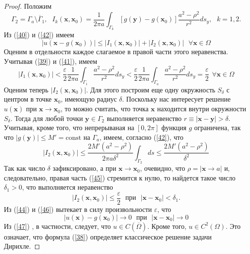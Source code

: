 \documentclass[14pt, a4paper]{extarticle}
\let\oldref\ref
\renewcommand{\ref}[1]{(\oldref{#1})}
\begin{document}
\begin{proof}
					Положим 
					\begin{equation}
						\Gamma_2 = \Gamma_a \setminus \overline{\Gamma}_1, \:\:\: I_k(\mathbf{x}, \mathbf{x}_0) = \dfrac{1}{2\pi a} \int_{\Gamma_k} [ g({\mathbf{y}}) - g({\mathbf{x}_0}) ] \dfrac{a^2-\rho^2}{r^2} ds_y, \:\:\: k = 1, 2. \label{42}
					\end{equation}
					Из \ref{40} и \ref{42} имеем
					\begin{equation}
						| u(\mathbf{x} - g(\mathbf{x}_0)) | \leq | I_1(\mathbf{x}, \mathbf{x}_0) | +  | I_2(\mathbf{x}, \mathbf{x}_0) | \:\:\: \forall \mathbf{x} \in \Omega
					\end{equation}
					Оценим в отдельности каждое слагаемое в правой части этого неравенства. Учитывая \ref{39} и \ref{41}, имеем 
					\begin{equation}
						| I_1(\mathbf{x}, \mathbf{x}_0) |  < \dfrac{\varepsilon}{2} \dfrac{1}{2\pi a} \int_{\Gamma_1} \dfrac{a^2-\rho^2}{r^2} ds_y < \dfrac{\varepsilon}{2} \dfrac{1}{2\pi a} \int_{\Gamma_a} \dfrac{a^2-\rho^2}{r^2} ds_y = \dfrac{\varepsilon}{2} \:\: \forall \mathbf{x} \in \Omega \label{44}
					\end{equation}
					Оценим теперь $ | I_2(\mathbf{x}, \mathbf{x}_0) | $. Для этого построим еще одну окружность $S_\delta$ с центром в точке $ \mathbf{x}_0 $, имеющую радиус $\delta$. Поскольку нас интересует решение $u(\mathbf{x})$ при $\mathbf{x} \rightarrow \mathbf{x}_0$, то можно считать, что точка $\mathbf{x}$ находится внутри окружности $ S_\delta $. Тогда для любой точки $\mathbf{y} \in \Gamma_2$ выполняется неравенство $ r \equiv | \mathbf{x} - \mathbf{y} | > \delta $. Учитывая, кроме того, что непрерываная на $ [0, 2\pi] $ функция $g$	ограничена, так что $ | g(\mathbf{y}) | \leq M'  = \text{const}$ на $\Gamma_a$, имеем, согласно  \ref{42}, что
					\begin{equation}
						| I_2(\mathbf{x}, \mathbf{x}_0) | \leq \dfrac{2M'(a^2- \rho^2)}{2\pi a\delta^2} \int_{\Gamma_2}ds \leq \dfrac{2M'(a^2- \rho^2)}{\delta^2} \label{45}
					\end{equation}
					Так как число $ \delta $ зафиксировано, а при $\mathbf{x} \rightarrow \mathbf{x}_0$, очевидно, что $ \rho = | \mathbf{x} \rightarrow a | $ и, следовательно, правая часть \ref{45} стремится к нулю, то найдется такое число $\delta_1 > 0$, что выполняется неравенство
					\begin{equation}
							| I_2(\mathbf{x}, \mathbf{x}_0) |  \leq \dfrac{\varepsilon}{2} \:\:\: \text{при} \:\:\:  | \mathbf{x} - \mathbf{x}_0 | < \delta_1. \label{46}
					\end{equation}
					Из \ref{44} и \ref{46} вытекает в силу произвольности $\varepsilon$, что
					\begin{equation}
						| u(\mathbf{x}) - g(\mathbf{x}_0) | \rightarrow 0 \:\:\: \text{при} \:\:\: | \mathbf{x} - \mathbf{x}_0 | \rightarrow 0 \label{47}
					\end{equation}					
					Из \ref{47} , в частности, следует, что $u \in C(\overline{\Omega})$. Кроме того, $ u \in C^2(\Omega) $. Это означает, что формула \ref{38} определяет классическое решение задачи Дирихле.
					\end{proof}
\end{document}
